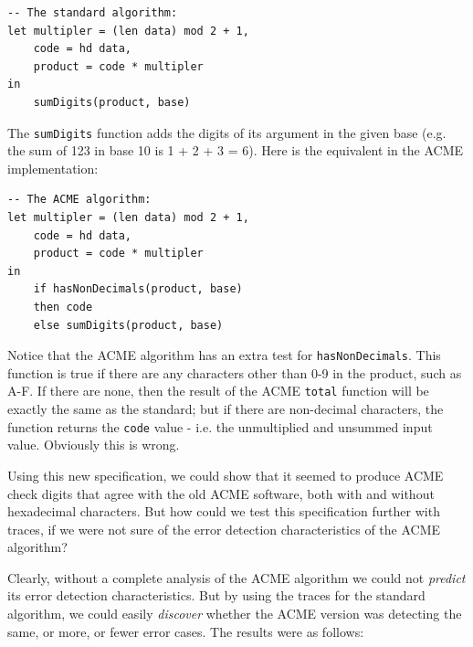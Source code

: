 \documentclass{overturerepchap}
\begin{document}
\small
\begin{lstlisting}
-- The standard algorithm:
let multipler = (len data) mod 2 + 1,
    code = hd data,
    product = code * multipler
in
    sumDigits(product, base)
\end{lstlisting}
\normalsize

\noindent The \texttt{sumDigits} function adds the digits of its argument in the
given base (e.g. the sum of 123 in base 10 is 1 + 2 + 3 = 6). Here is the
equivalent in the ACME implementation:

\small
\begin{lstlisting}
-- The ACME algorithm:
let multipler = (len data) mod 2 + 1,
    code = hd data,
    product = code * multipler
in
    if hasNonDecimals(product, base)
    then code
    else sumDigits(product, base)
\end{lstlisting}
\normalsize

\noindent Notice that the ACME algorithm has an extra test for
\texttt{hasNonDecimals}. This function is true if there are any characters other
than 0-9 in the product, such as A-F. If there are none, then the result of the
ACME \texttt{total} function will be exactly the same as the standard; but if
there are non-decimal characters, the function returns the \texttt{code} value
- i.e. the unmultiplied and unsummed input value. Obviously this is wrong.

Using this new specification, we could show that it seemed to produce ACME
check digits that agree with the old ACME software, both with and without
hexadecimal characters. But how could we test this specification further with
traces, if we were not sure of the error detection characteristics of the ACME
algorithm?

Clearly, without a complete analysis of the ACME algorithm we could not
\emph{predict} its error detection characteristics. But by using the traces for
the standard algorithm, we could easily \emph{discover} whether the ACME
version was detecting the same, or more, or fewer error cases. The results were
as follows:
\end{document}
